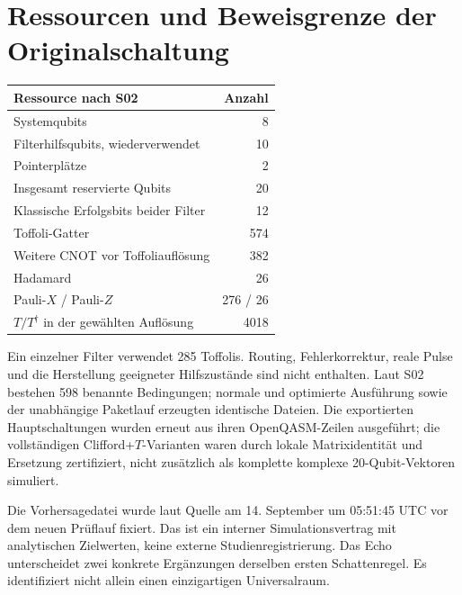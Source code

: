\section{Ressourcen und Beweisgrenze der Originalschaltung}
\par\noindent\begin{tabularx}{\linewidth}{Y r}
\toprule \textbf{Ressource nach S02}&\textbf{Anzahl}\\\midrule
Systemqubits&8\\Filterhilfsqubits, wiederverwendet&10\\Pointerplätze&2\\Insgesamt reservierte Qubits&20\\Klassische Erfolgsbits beider Filter&12\\Toffoli-Gatter&574\\Weitere CNOT vor Toffoliauflösung&382\\Hadamard&26\\Pauli-$X$ / Pauli-$Z$&276 / 26\\$T/T^\dagger$ in der gewählten Auflösung&4018\\\bottomrule
\end{tabularx}\par
Ein einzelner Filter verwendet 285 Toffolis. Routing, Fehlerkorrektur, reale Pulse und die Herstellung geeigneter Hilfszustände sind nicht enthalten. Laut S02 bestehen 598 benannte Bedingungen; normale und optimierte Ausführung sowie der unabhängige Paketlauf erzeugten identische Dateien. Die exportierten Hauptschaltungen wurden erneut aus ihren OpenQASM-Zeilen ausgeführt; die vollständigen Clifford+$T$-Varianten waren durch lokale Matrixidentität und Ersetzung zertifiziert, nicht zusätzlich als komplette komplexe 20-Qubit-Vektoren simuliert.

Die Vorhersagedatei wurde laut Quelle am 14. September um 05:51:45 UTC vor dem neuen Prüflauf fixiert. Das ist ein interner Simulationsvertrag mit analytischen Zielwerten, keine externe Studienregistrierung. Das Echo unterscheidet zwei konkrete Ergänzungen derselben ersten Schattenregel. Es identifiziert nicht allein einen einzigartigen Universalraum.
